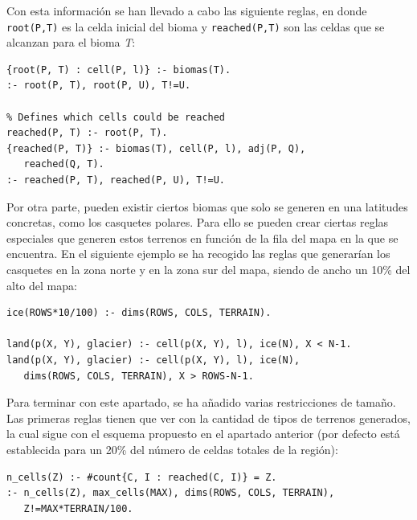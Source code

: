 Con esta información se han llevado a cabo las siguiente reglas, en donde \texttt{root(P,T)} es la celda inicial del bioma y \texttt{reached(P,T)} son las celdas que se alcanzan para el bioma \textit{T}: \\

\begin{lstlisting}[label=lst:biomas]
% The root of a bioma
{root(P, T) : cell(P, l)} :- biomas(T).
:- root(P, T), root(P, U), T!=U.

% Defines which cells could be reached
reached(P, T) :- root(P, T).
{reached(P, T)} :- biomas(T), cell(P, l), adj(P, Q),
   reached(Q, T).
:- reached(P, T), reached(P, U), T!=U.
\end{lstlisting}

\hspace{1em}

Por otra parte, pueden existir ciertos biomas que solo se generen en una latitudes concretas, como los casquetes polares. Para ello se pueden crear ciertas reglas especiales que generen estos terrenos en función de la fila del mapa en la que se encuentra. En el siguiente ejemplo se ha recogido las reglas que generarían los casquetes en la zona norte y en la zona sur del mapa, siendo de ancho un 10\% del alto del mapa: \\

\begin{lstlisting}[label=lst:glaciers]
ice(ROWS*10/100) :- dims(ROWS, COLS, TERRAIN).

land(p(X, Y), glacier) :- cell(p(X, Y), l), ice(N), X < N-1.
land(p(X, Y), glacier) :- cell(p(X, Y), l), ice(N),
   dims(ROWS, COLS, TERRAIN), X > ROWS-N-1.
\end{lstlisting}

\hspace{1em}

Para terminar con este apartado, se ha añadido varias restricciones de tamaño. Las primeras reglas tienen que ver con la cantidad de tipos de terrenos generados, la cual sigue con el esquema propuesto en el apartado anterior (por defecto está establecida para un 20\% del número de celdas totales de la región): \\

\begin{lstlisting}[label=lst:tmax]
n_cells(Z) :- #count{C, I : reached(C, I)} = Z.
:- n_cells(Z), max_cells(MAX), dims(ROWS, COLS, TERRAIN),
   Z!=MAX*TERRAIN/100.
\end{lstlisting}

\hspace{1em}

